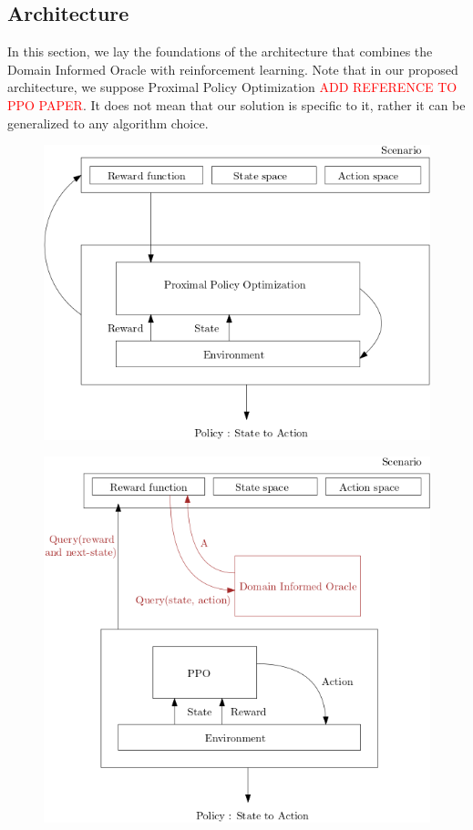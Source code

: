 \subsection{Architecture}
In this section, we lay the foundations of the architecture that combines the Domain Informed Oracle with 
reinforcement learning. Note that in our proposed architecture, we suppose Proximal Policy Optimization \textcolor{red}{ADD REFERENCE TO PPO PAPER}. 
It does not mean that our solution is specific to it, rather it can be generalized to any algorithm choice.

\medskip 

\begin{figure}[H]
  \centering
  \begin{minipage}{.5\textwidth}
    \centering
    \includegraphics[width=1\linewidth]{figures/basicrl.png}
    \label{fig:basicrl}
  \end{minipage}%
  \begin{minipage}{.45\textwidth}
    \centering
    \includegraphics[width=1\linewidth]{figures/dio.png}

\end{minipage}
\end{figure}
